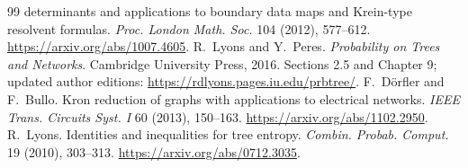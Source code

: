 \begin{thebibliography}{99}
determinants and applications to boundary data maps and Krein-type
resolvent formulas. \emph{Proc. London Math. Soc.} 104 (2012), 577--612.
\url{https://arxiv.org/abs/1007.4605}.
 R.~Lyons and Y.~Peres. \emph{Probability on Trees
and Networks}. Cambridge University Press, 2016. Sections 2.5 and
Chapter 9; updated author editions:
\url{https://rdlyons.pages.iu.edu/prbtree/}.
 F.~D\"orfler and F.~Bullo. Kron reduction of graphs
with applications to electrical networks.
\emph{IEEE Trans. Circuits Syst. I} 60 (2013), 150--163.
\url{https://arxiv.org/abs/1102.2950}.
 R.~Lyons. Identities and inequalities for tree
entropy. \emph{Combin. Probab. Comput.} 19 (2010), 303--313.
\url{https://arxiv.org/abs/0712.3035}.
\end{thebibliography}
\endgroup
